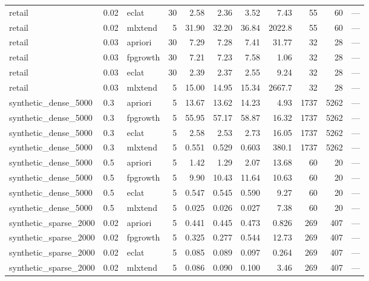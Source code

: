\documentclass[twocolumn,10pt]{article}
\begin{document}
\begin{longtable}{p{3.0cm}llrrrrrrrp{2.4cm}}
retail & 0.02 & eclat & 30 & 2.58 & 2.36 & 3.52 & 7.43 & 55 & 60 & --- \\
retail & 0.02 & mlxtend & 5 & 31.90 & 32.20 & 36.84 & 2022.8 & 55 & 60 & --- \\
retail & 0.03 & apriori & 30 & 7.29 & 7.28 & 7.41 & 31.77 & 32 & 28 & --- \\
retail & 0.03 & fpgrowth & 30 & 7.21 & 7.23 & 7.58 & 1.06 & 32 & 28 & --- \\
retail & 0.03 & eclat & 30 & 2.39 & 2.37 & 2.55 & 9.24 & 32 & 28 & --- \\
retail & 0.03 & mlxtend & 5 & 15.00 & 14.95 & 15.34 & 2667.7 & 32 & 28 & --- \\
synthetic\_\allowbreak{}dense\_\allowbreak{}5000 & 0.3 & apriori & 5 & 13.67 & 13.62 & 14.23 & 4.93 & 1737 & 5262 & --- \\
synthetic\_\allowbreak{}dense\_\allowbreak{}5000 & 0.3 & fpgrowth & 5 & 55.95 & 57.17 & 58.87 & 16.32 & 1737 & 5262 & --- \\
synthetic\_\allowbreak{}dense\_\allowbreak{}5000 & 0.3 & eclat & 5 & 2.58 & 2.53 & 2.73 & 16.05 & 1737 & 5262 & --- \\
synthetic\_\allowbreak{}dense\_\allowbreak{}5000 & 0.3 & mlxtend & 5 & 0.551 & 0.529 & 0.603 & 380.1 & 1737 & 5262 & --- \\
synthetic\_\allowbreak{}dense\_\allowbreak{}5000 & 0.5 & apriori & 5 & 1.42 & 1.29 & 2.07 & 13.68 & 60 & 20 & --- \\
synthetic\_\allowbreak{}dense\_\allowbreak{}5000 & 0.5 & fpgrowth & 5 & 9.90 & 10.43 & 11.64 & 10.63 & 60 & 20 & --- \\
synthetic\_\allowbreak{}dense\_\allowbreak{}5000 & 0.5 & eclat & 5 & 0.547 & 0.545 & 0.590 & 9.27 & 60 & 20 & --- \\
synthetic\_\allowbreak{}dense\_\allowbreak{}5000 & 0.5 & mlxtend & 5 & 0.025 & 0.026 & 0.027 & 7.38 & 60 & 20 & --- \\
synthetic\_\allowbreak{}sparse\_\allowbreak{}2000 & 0.02 & apriori & 5 & 0.441 & 0.445 & 0.473 & 0.826 & 269 & 407 & --- \\
synthetic\_\allowbreak{}sparse\_\allowbreak{}2000 & 0.02 & fpgrowth & 5 & 0.325 & 0.277 & 0.544 & 12.73 & 269 & 407 & --- \\
synthetic\_\allowbreak{}sparse\_\allowbreak{}2000 & 0.02 & eclat & 5 & 0.085 & 0.089 & 0.097 & 0.264 & 269 & 407 & --- \\
synthetic\_\allowbreak{}sparse\_\allowbreak{}2000 & 0.02 & mlxtend & 5 & 0.086 & 0.090 & 0.100 & 3.46 & 269 & 407 & --- \\

\end{longtable}
\end{document}
